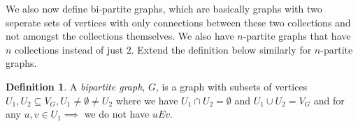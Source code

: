 \documentclass[11pt,a4paper]{article}
\theoremstyle{plain}
\theoremstyle{definition}
\newtheorem{definition}[theorem]{Definition}
\theoremstyle{remark}
\begin{document}
\noindent
We also now define bi-partite graphs, which are basically graphs with two seperate sets of vertices with only connections between these two collections and not amongst the collections themselves. We also have $n$-partite graphs that have $n$ collections instead of just $2$. Extend the definition below similarly for $n$-partite graphs.

\begin{definition}
    A \emph{bipartite graph}, $G$, is a graph with subsets of vertices $U_1, U_2 \subseteq V_G, U_1 \neq \emptyset \neq U_2$ where we have $U_1 \cap U_2 = \emptyset$ and $U_1 \cup U_2 = V_G$ and for any $u,v \in U_1 \implies $ we do not have $u E v$.
\end{definition}
\end{document}
